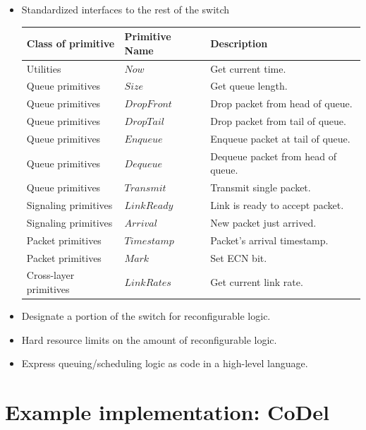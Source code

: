 {\begin{multicols}{2}
\begin{itemize}
\item Standardized interfaces to the rest of the switch

\begin{center}

\begin{tabular}{|l|l|l|}
\hline
\bf Class of primitive & \bf Primitive Name & \bf Description \\
\hline
Utilities & $Now$ & Get current time. \\
\hline
Queue primitives & $Size$ & Get queue length. \\
\hline
Queue primitives & $DropFront$ & Drop packet from head of queue.  \\
\hline
Queue primitives & $DropTail$ & Drop packet from tail of queue. \\
\hline
Queue primitives & $Enqueue$ & Enqueue packet at tail of queue. \\
\hline
Queue primitives & $Dequeue$ & Dequeue packet from head of queue. \\
\hline
Queue primitives & $Transmit$ & Transmit single packet. \\
\hline
Signaling primitives & $LinkReady$ & Link is ready to accept packet. \\
\hline
Signaling primitives & $Arrival$ & New packet just arrived. \\
\hline
Packet primitives & $Timestamp$ & Packet's arrival timestamp. \\
\hline
Packet primitives & $Mark$ & Set ECN bit. \\
\hline
Cross-layer primitives & $LinkRates$ & Get current link rate. \\
\hline
\end{tabular}
\end{center}

\item Designate a portion of the switch for reconfigurable logic.
\item Hard resource limits on the amount of reconfigurable logic.
\item Express queuing/scheduling logic as code in a high-level language.
\end{itemize}

\section*{Example implementation: CoDel}


\end{multicols}}
